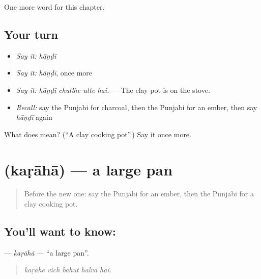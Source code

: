 \begin{grammarlens}[title={What you've built}]
One more word for this chapter.
\end{grammarlens}

\subsection*{Your turn}
\begin{itemize}
\raggedright
  \item \emph{Say it:} \emph{hāṇḍī}
  \item \emph{Say it:} \emph{hāṇḍī}, once more
  \item \emph{Say it:} \emph{hāṇḍī chullhe utte hai.} — The clay pot is on the stove.
  \item \emph{Recall:} say the Punjabi for charcoal, then the Punjabi for an ember, then say \emph{hāṇḍī} again
\end{itemize}

\begin{tcolorbox}[breakable,colback=teal!4,colframe=teal!35!black,title={Before you move on}]
What does  mean? (\textquotedblleft{}A clay cooking pot\textquotedblright{}.) Say it once more.
\end{tcolorbox}
\section[\texorpdfstring{\pa{ਕੜਾਹਾ} (kaṛāhā)}{ਕੜਾਹਾ (kaṛāhā)}]{ (kaṛāhā) — a large pan}

\label{lesson:PA-C250-karaha}



\begin{quote}
Before the new one: say the Punjabi for an ember, then the Punjabi for a clay cooking pot.
\end{quote}

\subsection*{You'll want to know: }
\textbf{} — \emph{kaṛāhā} — \textquotedblleft{}a large pan\textquotedblright{}.

\begin{quote}
    
\end{quote}

\begin{quote}
\emph{kaṛāhe vich bahut halvā hai.}
\end{quote}

